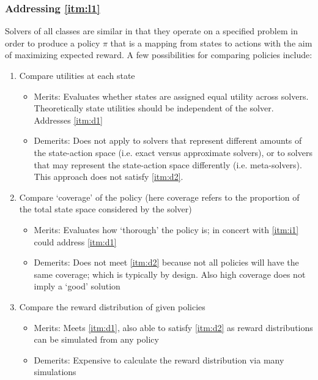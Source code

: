    \subsubsection{Addressing \ref{itm:l1}} \label{sec:compare_policies}
        Solvers of all classes are similar in that they operate on a specified problem in order to produce a policy $\pi$ that is a mapping from states to actions with the aim of maximizing expected reward. A few possibilities for comparing policies include:
    
        \begin{enumerate}
            \item Compare utilities at each state \label{itm:i1}
            \begin{itemize}
                \item Merits: Evaluates whether states are assigned equal utility across solvers. Theoretically state utilities should be independent of the solver. Addresses \ref{itm:d1}
                \item Demerits: Does not apply to solvers that represent different amounts of the state-action space (i.e. exact versus approximate solvers), or to solvers that may represent the state-action space differently (i.e. meta-solvers). This approach does not satisfy \ref{itm:d2}.
            \end{itemize} 
            \item Compare `coverage' of the policy (here coverage refers to the proportion of the total state space considered by the solver) \label{itm:i2}
            \begin{itemize}
                \item Merits: Evaluates how `thorough' the policy is; in concert with \ref{itm:i1} could address \ref{itm:d1}
                \item Demerits: Does not meet \ref{itm:d2} because not all policies will have the same coverage; which is typically by design. Also high coverage does not imply a `good' solution
            \end{itemize}
            \item Compare the reward distribution of given policies \label{itm:i3}
            \begin{itemize}
                \item Merits: Meets \ref{itm:d1}, also able to satisfy \ref{itm:d2} as reward distributions can be simulated from any policy
                \item Demerits: Expensive to calculate the reward distribution via many simulations
            \end{itemize}
        \end{enumerate}

